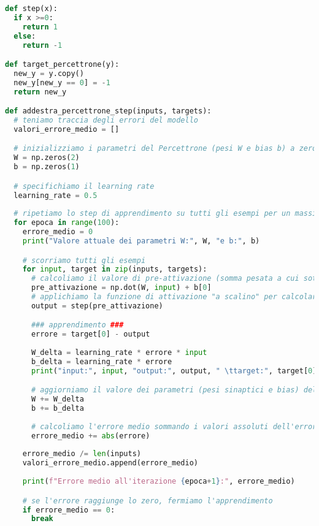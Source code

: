 \documentclass[12pt, a4paper]{article}
\begin{document}
\begin{lstlisting}[language=Python, caption=Funzioni di Addestramento]
def step(x):
  if x >=0:
    return 1
  else:
    return -1

def target_percettrone(y):
  new_y = y.copy()
  new_y[new_y == 0] = -1
  return new_y

def addestra_percettrone_step(inputs, targets):
  # teniamo traccia degli errori del modello
  valori_errore_medio = []  

  # inizializziamo i parametri del Percettrone (pesi W e bias b) a zero
  W = np.zeros(2)  
  b = np.zeros(1)

  # specifichiamo il learning rate
  learning_rate = 0.5
  
  # ripetiamo lo step di apprendimento su tutti gli esempi per un massimo di 100 volte
  for epoca in range(100):  
    errore_medio = 0
    print("Valore attuale dei parametri W:", W, "e b:", b)

    # scorriamo tutti gli esempi
    for input, target in zip(inputs, targets): 
      # calcoliamo il valore di pre-attivazione (somma pesata a cui sottraggo il bias) 
      pre_attivazione = np.dot(W, input) + b[0]  
      # applichiamo la funzione di attivazione "a scalino" per calcolare l'output
      output = step(pre_attivazione)  

      ### apprendimento ###
      errore = target[0] - output
      
      W_delta = learning_rate * errore * input
      b_delta = learning_rate * errore
      print("input:", input, "output:", output, " \ttarget:", target[0], " \terrore:", errore, " \tW_delta:", W_delta, " \tb_delta:", b_delta)

      # aggiorniamo il valore dei parametri (pesi sinaptici e bias) del Percettrone
      W += W_delta  
      b += b_delta
      
      # calcoliamo l'errore medio sommando i valori assoluti dell'errore
      errore_medio += abs(errore) 
      
    errore_medio /= len(inputs)
    valori_errore_medio.append(errore_medio)
    
    print(f"Errore medio all'iterazione {epoca+1}:", errore_medio)

    # se l'errore raggiunge lo zero, fermiamo l'apprendimento
    if errore_medio == 0: 
      break
\end{lstlisting}
\end{document}
